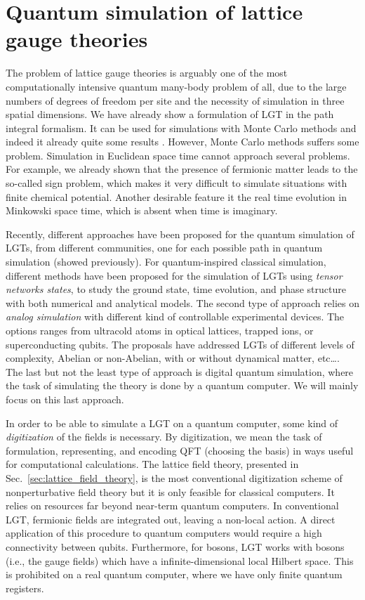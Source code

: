 \section{Quantum simulation of lattice gauge theories}
\label{sec:quantum_simulation_of_lattice_gauge_theories}

The problem of lattice gauge theories is arguably one of the most computationally intensive quantum many-body problem of all, due to the large numbers of degrees of freedom per site and the necessity of simulation in three spatial dimensions.
We have already show a formulation of LGT in the path integral formalism.
It can be used for simulations with Monte Carlo methods and indeed it already quite some results \citneeded.
However, Monte Carlo methods suffers some problem.
Simulation in Euclidean space time cannot approach several problems.
For example, we already shown that the presence of fermionic matter leads to the so-called sign problem, which makes it very difficult to simulate situations with finite chemical potential.
Another desirable feature it the real time evolution in Minkowski space time, which is absent when time is imaginary.

Recently, different approaches have been proposed for the quantum simulation of LGTs, from different communities, one for each possible path in quantum simulation (showed previously).
For quantum-inspired classical simulation, different methods have been proposed for the simulation of LGTs using \emph{tensor networks states}, to study the ground state, time evolution, and phase structure with both numerical and analytical models.
The second type of approach relies on \emph{analog simulation} with different kind of controllable experimental devices.
The options ranges from ultracold atoms in optical lattices\citneeded, trapped ions\citneeded, or superconducting qubits\citneeded.
The proposals have addressed LGTs of different levels of complexity, Abelian or non-Abelian, with or without dynamical matter, etc\dots.
The last but not the least type of approach is digital quantum simulation, where the task of simulating the theory is done by a quantum computer.
We will mainly focus on this last approach.

In order to be able to simulate a LGT on a quantum computer, some kind of \emph{digitization} of the fields is necessary.
By digitization, we mean the task of formulation, representing, and encoding QFT (choosing the basis) in ways useful for computational calculations.
The lattice field theory, presented in Sec.~\ref{sec:lattice_field_theory}, is the most conventional digitization scheme of nonperturbative field theory but it is only feasible for classical computers.
It relies on resources far beyond near-term quantum computers.
In conventional LGT, fermionic fields are integrated out, leaving a non-local action.
A direct application of this procedure to quantum computers would require a high connectivity between qubits.
Furthermore, for bosons, LGT works with bosons (i.e., the gauge fields) which have a infinite-dimensional local Hilbert space.
This is prohibited on a real quantum computer, where we have only finite quantum registers.

